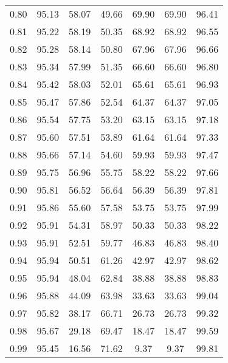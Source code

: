 \begin{tabular}{|c|c|c|c|c|c|c|}
      0.80 &     95.13 &     58.07 &      49.66 &   69.90 &      69.90 &         96.41 \\
      0.81 &     95.22 &     58.19 &      50.35 &   68.92 &      68.92 &         96.55 \\
      0.82 &     95.28 &     58.14 &      50.80 &   67.96 &      67.96 &         96.66 \\
      0.83 &     95.34 &     57.99 &      51.35 &   66.60 &      66.60 &         96.80 \\
      0.84 &     95.42 &     58.03 &      52.01 &   65.61 &      65.61 &         96.93 \\
      0.85 &     95.47 &     57.86 &      52.54 &   64.37 &      64.37 &         97.05 \\
      0.86 &     95.54 &     57.75 &      53.20 &   63.15 &      63.15 &         97.18 \\
      0.87 &     95.60 &     57.51 &      53.89 &   61.64 &      61.64 &         97.33 \\
      0.88 &     95.66 &     57.14 &      54.60 &   59.93 &      59.93 &         97.47 \\
      0.89 &     95.75 &     56.96 &      55.75 &   58.22 &      58.22 &         97.66 \\
      0.90 &     95.81 &     56.52 &      56.64 &   56.39 &      56.39 &         97.81 \\
      0.91 &     95.86 &     55.60 &      57.58 &   53.75 &      53.75 &         97.99 \\
      0.92 &     95.91 &     54.31 &      58.97 &   50.33 &      50.33 &         98.22 \\
      0.93 &     95.91 &     52.51 &      59.77 &   46.83 &      46.83 &         98.40 \\
      0.94 &     95.94 &     50.51 &      61.26 &   42.97 &      42.97 &         98.62 \\
      0.95 &     95.94 &     48.04 &      62.84 &   38.88 &      38.88 &         98.83 \\
      0.96 &     95.88 &     44.09 &      63.98 &   33.63 &      33.63 &         99.04 \\
      0.97 &     95.82 &     38.17 &      66.71 &   26.73 &      26.73 &         99.32 \\
      0.98 &     95.67 &     29.18 &      69.47 &   18.47 &      18.47 &         99.59 \\
      0.99 &     95.45 &     16.56 &      71.62 &    9.37 &       9.37 &         99.81 \\
\bottomrule
\end{tabular}
